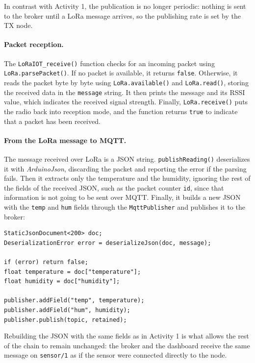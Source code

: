 \documentclass[informe,english]{plantilla}
\begin{document}
In contrast with Activity 1, the publication is no longer periodic: nothing is sent to the broker until a LoRa message arrives, so the publishing rate is set by the TX node.

\paragraph{Packet reception.} The \texttt{LoRaIOT\_receive()} function checks for an incoming packet using \texttt{LoRa.parsePacket()}. If no packet is available, it returns \texttt{false}. Otherwise, it reads the packet byte by byte using \texttt{LoRa.available()} and \texttt{LoRa.read()}, storing the received data in the \texttt{message} string. It then prints the message and its RSSI value, which indicates the received signal strength. Finally, \texttt{LoRa.receive()} puts the radio back into reception mode, and the function returns \texttt{true} to indicate that a packet has been received.

\paragraph{From the LoRa message to MQTT.} The message received over LoRa is a JSON string. \texttt{publishReading()} deserializes it with \textit{ArduinoJson}, discarding the packet and reporting the error if the parsing fails. Then it extracts only the temperature and the humidity, ignoring the rest of the fields of the received JSON, such as the packet counter \texttt{id}, since that information is not going to be sent over MQTT. Finally, it builds a new JSON with the \texttt{temp} and \texttt{hum} fields through the \texttt{MqttPublisher} and publishes it to the broker:

\begin{lstlisting}[style=arduino]
StaticJsonDocument<200> doc;
DeserializationError error = deserializeJson(doc, message);

if (error) return false;
float temperature = doc["temperature"];
float humidity = doc["humidity"];

publisher.addField("temp", temperature);
publisher.addField("hum", humidity);
publisher.publish(topic, retained);
\end{lstlisting}

Rebuilding the JSON with the same fields as in Activity 1 is what allows the rest of the chain to remain unchanged: the broker and the dashboard receive the same message on \texttt{sensor/1} as if the sensor were connected directly to the node.
\end{document}
